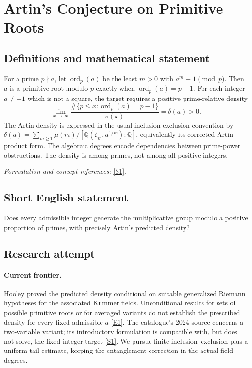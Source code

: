 \documentclass[11pt,a4paper]{article}
\newcommand{\Q}{\mathbb{Q}}
\newcommand{\sref}[2]{\hyperlink{source:#1:#2}{[S#2]}}
\newcommand{\eref}[2]{\hyperlink{extra:#1:#2}{[E#2]}}
\newif\ifshowcatalogue
\newcommand{\cataloguescope}[1]{\ifshowcatalogue
 \paragraph{Exact scope in the supplied catalogue.}
 \begin{quote}\small #1\end{quote}\fi}
\numberwithin{equation}{section}
\begin{document}
\setcounter{section}{0}
\clearpage
\section*{\texorpdfstring{Artin's Conjecture on Primitive Roots}{Artin's Conjecture on Primitive Roots}}\label{statement}
\subsection{Definitions and mathematical statement}
For a prime $p\nmid a$, let $\operatorname{ord}_p(a)$ be the least $m>0$ with $a^m\equiv1\pmod p$. Then $a$ is a primitive root modulo $p$ exactly when $\operatorname{ord}_p(a)=p-1$. For each integer $a\ne-1$ which is not a square, the target requires a positive prime-relative density
\[
 \lim_{x\to\infty}\frac{\#\{p\le x:\operatorname{ord}_p(a)=p-1\}}{\pi(x)}=\delta(a)>0.
\]
The Artin density is expressed in the usual inclusion-exclusion convention by
$\delta(a)=\sum_{m\ge1}\mu(m)/[\Q(\zeta_m,a^{1/m}):\Q]$, equivalently its corrected Artin-product form. The algebraic degrees encode dependencies between prime-power obstructions. The density is among primes, not among all positive integers.
\par\smallskip\textit{Formulation and concept references:} \sref{statement}{1}.
\cataloguescope{Prove or disprove that every integer a other than -1 that is not a perfect square is a primitive root modulo p for a positive natural density of primes p, with the density given by Artin's predicted correction factor.}
\subsection{Short English statement}
Does every admissible integer generate the multiplicative group modulo a positive proportion of primes, with precisely Artin's predicted density?
\subsection{Research attempt}

\paragraph{Current frontier.}
Hooley proved the predicted density conditional on suitable generalized Riemann hypotheses for the associated Kummer fields. Unconditional results for sets of possible primitive roots or for averaged variants do not establish the prescribed density for every fixed admissible $a$ \eref{statement}{1}. The catalogue's 2024 source concerns a two-variable variant; its introductory formulation is compatible with, but does not solve, the fixed-integer target \sref{statement}{1}. We pursue finite inclusion--exclusion plus a uniform tail estimate, keeping the entanglement correction in the actual field degrees.
\end{document}
